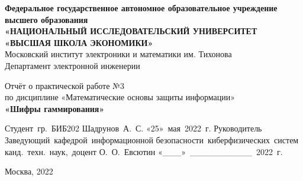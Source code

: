 \begin{titlepage}

\begin{center}
    
{\large\bf Федеральное‌ ‌государственное‌ ‌автономное‌ ‌образовательное‌ ‌учреждение‌ ‌высшего‌ образования\\}
{\large\bf «НАЦИОНАЛЬНЫЙ‌ ‌ИССЛЕДОВАТЕЛЬСКИЙ‌ ‌УНИВЕРСИТЕТ‌ «ВЫСШАЯ‌ ‌ШКОЛА‌ ‌ЭКОНОМИКИ»‌\\}
Московский‌ ‌институт‌ ‌электроники‌ ‌и‌ ‌математики‌ ‌им. Тихонова‌\\ 
Департамент‌ ‌электронной‌ ‌инженерии‌\\

\vfill

Отчёт о практической работе №3\\
по дисциплине «Математические основы защиты информации»\\
{\bf «Шифры гаммирования»‌}

\vfill
\vfill
\vfill

\hfill\vbox
{
\hbox{Студент гр. БИБ202}
\hbox{Шадрунов А. С.}
\hbox{«25» мая 2022 г.}
\hbox{Руководитель}
\hbox{Заведующий кафедрой информационной}
\hbox{безопасности киберфизических систем}
\hbox{канд. техн. наук, доцент}
\hbox{О. О. Евсютин}
\hbox{«\_\_\_» \_\_\_\_\_\_\_\_\_\_ 2022 г.}
}

\vfill

Москва, 2022
\end{center}

\end{titlepage}


